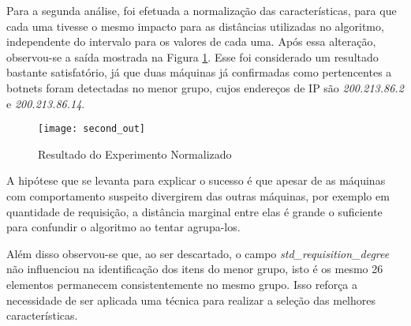 Para a segunda análise, foi efetuada a normalização das características, para que cada uma tivesse o mesmo impacto para as distâncias utilizadas no algoritmo, independente do intervalo para os valores de cada uma. Após essa alteração, observou-se a saída mostrada na Figura \ref{fig:second_out}. Esse foi considerado um resultado bastante satisfatório, já que duas máquinas já confirmadas como pertencentes a botnets foram detectadas no menor grupo, cujos endereços de IP são \textit{200.213.86.2} e \textit{200.213.86.14}.

\begin{figure}[htbp]
\centering
\texttt{[image: second\_out]}
\caption[Resultado do Experimento Normalizado]{Resultado do Experimento Normalizado} \label{fig:second_out}
\end{figure}

A hipótese que se levanta para explicar o sucesso é que apesar de as máquinas com comportamento suspeito divergirem das outras máquinas, por exemplo em quantidade de requisição, a distância marginal entre elas é grande o suficiente para confundir o algoritmo ao tentar agrupa-los.

Além disso observou-se que, ao ser descartado, o campo \textit{std\_requisition\_degree} não influenciou na identificação dos itens do menor grupo, isto é os mesmo 26 elementos permanecem consistentemente no mesmo grupo. Isso reforça a necessidade de ser aplicada uma técnica para realizar a seleção das melhores características.